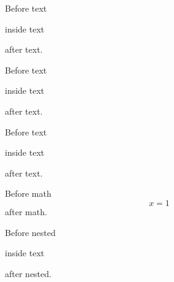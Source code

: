 Before text \begin{note}inside text\end{note} after text.

Before text \begin{note}inside text\end{note}
after text.

Before text \begin{note}inside text\end{note}%
after text.

Before math \begin{equation}x = 1\end{equation} after math.

\begin{outer}
Before nested \begin{inner}inside text\end{inner} after nested.
\end{outer}

